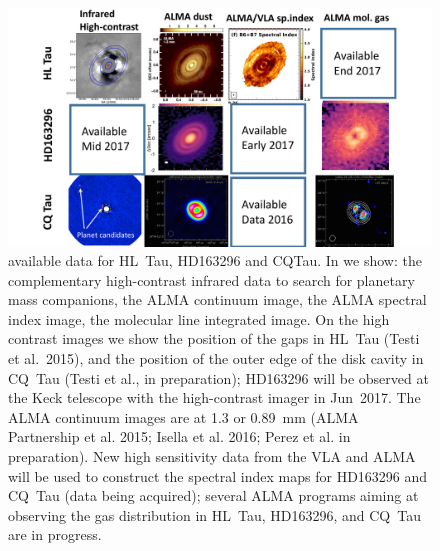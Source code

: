 \documentclass[10pt,fleqn,twoside]{article}
\begin{document}
\begin{figure}
\centerline{\includegraphics[scale=0.4,angle=0]{f_highres_data.pdf}}
\caption{ 
available data for HL~Tau, HD163296 and CQTau. In  we show: the complementary high-contrast infrared data to search for planetary mass companions, the ALMA continuum image, the ALMA spectral index image, the molecular line integrated image. On the high contrast images we show the position of the gaps in HL~Tau (Testi et al.~2015), and the position of the outer edge of the 
disk cavity in CQ~Tau (Testi et al., in preparation); HD163296 will be observed at the Keck telescope with the high-contrast imager in Jun~2017. The ALMA continuum images are at 1.3 or 0.89~mm (ALMA Partnership et al. 2015; Isella et al. 2016; Perez et al. in preparation). New high sensitivity data from the VLA and ALMA will be used to construct the spectral index maps for HD163296 and CQ~Tau (data being acquired); several ALMA programs aiming at observing the gas distribution in HL~Tau, HD163296, and CQ~Tau are in progress.}
\label{f_nir_alma}
\end{figure}
\end{document}
